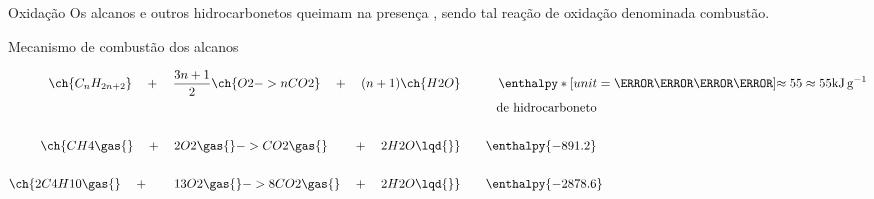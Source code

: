 \documentclass[presentation,professionalfonts,aspectratio=169]{beamer}
\begin{document}
\begin{frame}[label={sec:orgd298ae7}]{Oxidação}
Os \alert{alcanos} e outros \alert{hidrocarbonetos} queimam na presença , sendo tal reação de oxidação denominada
\alert{combustão}.


\begin{bclogo}[couleur=blue!30 , arrondi=0.1 , logo=\bcplume , epBarre=3.5]{Mecanismo de combustão dos alcanos}


\begin{align*}
\ch{C_nH_{2n+2}} \quad + \quad  \frac{3n+1}{2}\ch{O2 -> n CO2}\quad +\quad (n+1)\ch{H2O} & \qquad \quad \enthalpy*[unit=\kilo\joule\per\gram]{\approx 55} \approx 55 \unit{\kilo\joule\per\gram}\\ & \hspace{1cm} \mathrm{de~hidrocarboneto} \\ \\
\ch{CH4\gas{} \quad{} + \quad{} 2 O2\gas{} -> CO2\gas{} \qquad{} + \quad{} 2 H2O\lqd{}} & \quad \quad \enthalpy{-891.2}\\ \\
	\ch{2 C4H10\gas{} \quad{} + \qquad{} 13 O2\gas{} -> 8 CO2\gas{} \quad{} + \quad{} 2 H2O\lqd{}} & \quad \quad \enthalpy{-2878.6}    
\end{align*}
\end{bclogo}
\end{frame}
\end{document}
